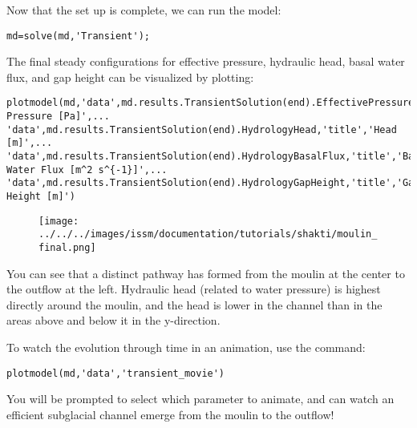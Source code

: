 Now that the set up is complete, we can run the model:
\begin{verbatim}md=solve(md,'Transient');\end{verbatim}

The final steady configurations for effective pressure, hydraulic head, basal water flux, and gap height can be visualized by plotting:
\begin{verbatim}plotmodel(md,'data',md.results.TransientSolution(end).EffectivePressure,'title','Effective Pressure [Pa]',...
'data',md.results.TransientSolution(end).HydrologyHead,'title','Head [m]',...
'data',md.results.TransientSolution(end).HydrologyBasalFlux,'title','Basal Water Flux [m^2 s^{-1}]',...
'data',md.results.TransientSolution(end).HydrologyGapHeight,'title','Gap Height [m]')\end{verbatim}

\begin{figure}[H]
	\begin{center}
		\texttt{[image: ../../../images/issm/documentation/tutorials/shakti/moulin\_final.png]}
	\end{center}
\end{figure}

You can see that a distinct pathway has formed from the moulin at the center to the outflow at the left. Hydraulic head (related to water pressure) is highest directly around the moulin, and the head is lower in the channel than in the areas above and below it in the y-direction. 

To watch the evolution through time in an animation, use the command: 
\begin{verbatim}plotmodel(md,'data','transient_movie')\end{verbatim}

You will be prompted to select which parameter to animate, and can watch an efficient subglacial channel emerge from the moulin to the outflow!
